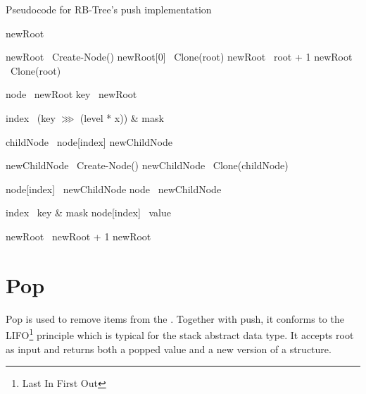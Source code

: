\begin{listing}[ht!]        
    \caption{Pseudocode for RB-Tree's push implementation}
    \label{lst:rb-tree-push}
    
    \begin{algorithmic}
            \State newRoot \la\ \nil{}

                \State newRoot \la\ Create-Node()
                \State newRoot[0] \la\ Clone(root)
                \State newRoot \la\ root + 1
            \Else 
                \State newRoot \la\ Clone(root)
            \EndIf
                        
            \State node \la\ newRoot
            \State key \la\ newRoot
    
                \State index \la\ (key $\ggg$ (level * x)) \& mask
                
                \State childNode \la\ node[index]
                \State newChildNode \la\ \nil{}

                    \State newChildNode \la\ Create-Node()
                \Else
                    \State newChildNode \la\ Clone(childNode)
                \EndIf
                
                \State node[index] \la\ newChildNode
                \State node \la\ newChildNode
            \EndFor        
    
            \State index \la\ key \& mask
            \State node[index] \la\ value 

            \State newRoot \la\ newRoot + 1
            \State \Return newRoot
        \EndFunction
    \end{algorithmic}
\end{listing}

\section{Pop}

Pop is used to remove items from the \rbtree. Together with push, it conforms to the LIFO\footnote{Last In First Out} principle which is typical for the stack abstract data type. It accepts root as input and returns both a popped value and a new version of a structure. 

